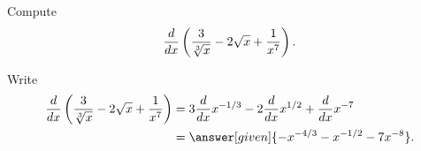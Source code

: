 \documentclass{ximera}
\begin{document}
\begin{example}
Compute
\[
\frac{d}{dx} \left(\frac{3}{\sqrt[3]{x}}-2\sqrt{x}+\frac{1}{x^7}\right).
\]
\begin{explanation}
Write
\begin{align*}
\ddx \left(\frac{3}{\sqrt[3]{x}}-2\sqrt{x}+\frac{1}{x^7}\right) &= 3\ddx x^{-1/3} -2\ddx x^{1/2}+\ddx x^{-7}\\
&=\answer[given]{-x^{-4/3} - x^{-1/2}-7x^{-8}}.
\end{align*}
\end{explanation}
\end{example}
\end{document}
